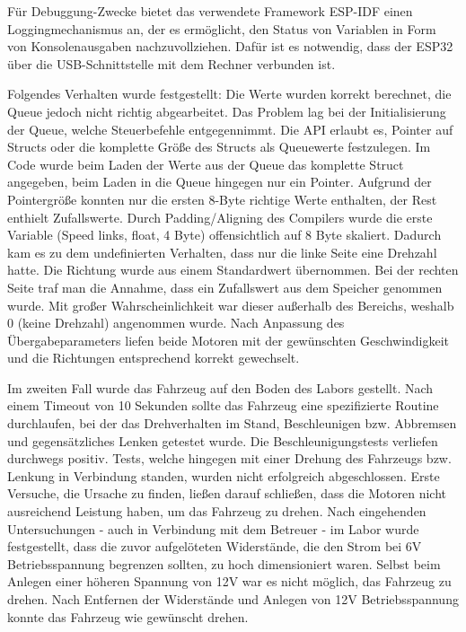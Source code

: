 Für Debuggung-Zwecke bietet das verwendete Framework ESP-IDF einen Loggingmechanismus an, der es ermöglicht, den Status von Variablen in Form von Konsolenausgaben nachzuvollziehen. Dafür ist es notwendig, dass der ESP32 über die USB-Schnittstelle mit dem Rechner verbunden ist. \newline

Folgendes Verhalten wurde festgestellt: Die Werte wurden korrekt berechnet, die Queue jedoch nicht richtig abgearbeitet. Das Problem lag bei der Initialisierung der Queue, welche Steuerbefehle entgegennimmt. Die API erlaubt es, Pointer auf Structs oder die komplette Größe des Structs als Queuewerte festzulegen. Im Code wurde beim Laden der Werte aus der Queue das komplette Struct angegeben, beim Laden in die Queue hingegen nur ein Pointer. Aufgrund der Pointergröße konnten nur die ersten 8-Byte richtige Werte enthalten, der Rest enthielt Zufallswerte. Durch Padding/Aligning des Compilers wurde die erste Variable (Speed links, float, 4 Byte) offensichtlich auf 8 Byte skaliert. Dadurch kam es zu dem undefinierten Verhalten, dass nur die linke Seite eine Drehzahl hatte. Die Richtung wurde aus einem Standardwert übernommen. Bei der rechten Seite traf man die Annahme, dass ein Zufallswert aus dem Speicher genommen wurde. Mit großer Wahrscheinlichkeit war dieser außerhalb des Bereichs, weshalb 0 (keine Drehzahl) angenommen wurde. Nach Anpassung des Übergabeparameters liefen beide Motoren mit der gewünschten Geschwindigkeit und die Richtungen entsprechend korrekt gewechselt. \newline

Im zweiten Fall wurde das Fahrzeug auf den Boden des Labors gestellt. Nach einem Timeout von 10 Sekunden sollte das Fahrzeug eine spezifizierte Routine durchlaufen, bei der das Drehverhalten im Stand, Beschleunigen bzw. Abbremsen und gegensätzliches Lenken getestet wurde. Die Beschleunigungstests verliefen durchwegs positiv. Tests, welche hingegen mit einer Drehung des Fahrzeugs bzw. Lenkung in Verbindung standen, wurden nicht erfolgreich abgeschlossen. Erste Versuche, die Ursache zu finden, ließen darauf schließen, dass die Motoren nicht ausreichend Leistung haben, um das Fahrzeug zu drehen. Nach eingehenden Untersuchungen - auch in Verbindung mit dem Betreuer - im Labor wurde festgestellt, dass die zuvor aufgelöteten Widerstände, die den Strom bei 6V Betriebsspannung begrenzen sollten, zu hoch dimensioniert waren. Selbst beim Anlegen einer höheren Spannung von 12V war es nicht möglich, das Fahrzeug zu drehen. Nach Entfernen der Widerstände und Anlegen von 12V Betriebsspannung konnte das Fahrzeug wie gewünscht drehen. \newline

